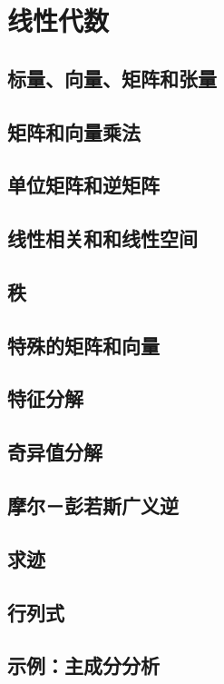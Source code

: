 \chapter{线性代数}
\label{chap:2}

\section{标量、向量、矩阵和张量}
\label{sec:2.1}

\section{矩阵和向量乘法}
\label{sec:2.2}

\section{单位矩阵和逆矩阵}
\label{sec:2.3}

\section{线性相关和和线性空间}
\label{sec:2.4}

\section{秩}
\label{sec:2.5}

\section{特殊的矩阵和向量}
\label{sec:2.6}

\section{特征分解}
\label{sec:2.7}

\section{奇异值分解}
\label{sec:2.8}

\section{摩尔－彭若斯广义逆}
\label{sec:2.9}

\section{求迹}
\label{sec:2.10}

\section{行列式}
\label{sec:2.11}

\section{示例：主成分分析}
\label{sec:2.12}
